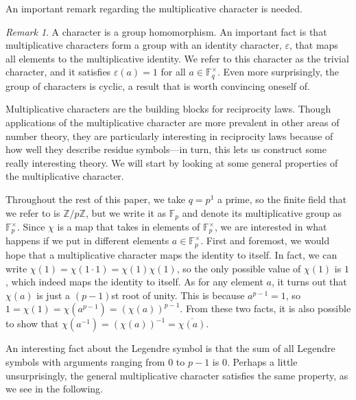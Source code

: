 \documentclass[10pt]{amsart}
\newcommand{\eps}{\varepsilon}
\newcommand{\ZZ}{\mathbb{Z}}
\theoremstyle{plain}
\theoremstyle{definition}
\theoremstyle{remark}
\newtheorem{rem}{Remark}
\numberwithin{equation}{section}
\begin{document}
An important remark regarding the multiplicative character is needed.

\begin{rem} \label{Remark: character is a cyclic group}
    A character is a group homomorphism. An important fact is that multiplicative characters form a group with an identity character, $\eps$, that maps all elements to the multiplicative identity. We refer to this character as the trivial character, and it satisfies $\eps(a)=1$ for all $a\in\mathbb{F}_{q}^{\times}$. Even more surprisingly, the group of characters is cyclic, a result that is worth convincing oneself of. 
\end{rem}

Multiplicative characters are the building blocks for reciprocity laws. Though applications of the multiplicative character are more prevalent in other areas of number theory, they are particularly interesting in reciprocity laws because of how well they describe residue symbols—in turn, this lets us construct some really interesting theory. We will start by looking at some general properties of the multiplicative character.

\indent Throughout the rest of this paper, we take $q=p^{1}$ a prime, so the finite field that we refer to is $\ZZ/p\ZZ$, but we write it as $\mathbb{F}_{p}$ and denote its multiplicative group as $\mathbb{F}_{p}^{\times}$. Since $\chi$ is a map that takes in elements of $\mathbb{F}_{p}^{\times}$, we are interested in what happens if we put in different elements $a\in\mathbb{F}_{p}^{\times}$. First and foremost, we would hope that a multiplicative character maps the identity to itself. In fact, we can write $\chi(1) = \chi(1\cdot 1) = \chi(1)\chi(1)$, so the only possible value of $\chi(1)$ is $1$, which indeed maps the identity to itself. As for any element $a$, it turns out that $\chi(a)$ is just a $(p-1)$st root of unity. This is because $a^{p-1}=1$, so $1=\chi(1)=\chi(a^{p-1})=(\chi(a))^{p-1}$. From these two facts, it is also possible to show that $\chi(a^{-1})=(\chi(a))^{-1}=\overline{\chi(a)}$.

\indent An interesting fact about the Legendre symbol is that the sum of all Legendre symbols with arguments ranging from $0$ to $p-1$ is $0$. Perhaps a little unsurprisingly, the general multiplicative character satisfies the same property, as we see in the following.
\end{document}
